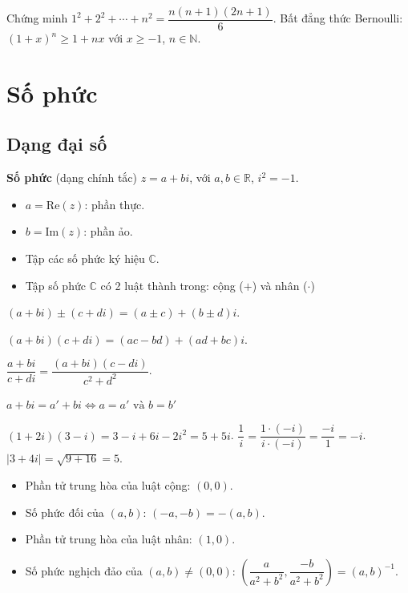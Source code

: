 \documentclass[12pt,a4paper]{article}
\begin{document}
\begin{vidu}
  Chứng minh $1^2 + 2^2 + \cdots + n^2 = \dfrac{n(n+1)(2n+1)}{6}$. Bất đẳng thức Bernoulli: $(1+x)^n \ge 1 + nx$ với $x \ge -1$, $n \in \mathbb{N}$.
\end{vidu}

\section{Số phức}

\subsection{Dạng đại số}

\begin{dinhnghia}
  \textbf{Số phức} (dạng chính tắc) $z = a + bi$, với $a, b \in \mathbb{R}$, $i^2 = -1$.
  \begin{itemize}
    \item $a = \mathrm{Re}(z)$: phần thực.
    \item $b = \mathrm{Im}(z)$: phần ảo.
    \item Tập các số phức ký hiệu $\mathbb{C}$.
    \item Tập số phức $\mathbb{C}$ có 2 luật thành trong: cộng ($+$) và nhân ($\cdot$)
  \end{itemize}
\end{dinhnghia}

\begin{congthuc}[title={Các phép toán}]
  $(a+bi) \pm (c+di) = (a \pm c) + (b \pm d)i$.
  
  $(a+bi)(c+di) = (ac-bd) + (ad+bc)i$.
  
  $\dfrac{a+bi}{c+di} = \dfrac{(a+bi)(c-di)}{c^2+d^2}$.

  $a + bi = a' + bi \Leftrightarrow a = a' \text{ và } b = b'$
\end{congthuc}

\begin{vidu}
  $(1+2i)(3-i) = 3 - i + 6i - 2i^2 = 5 + 5i$. $\dfrac{1}{i} = \dfrac{1 \cdot (-i)}{i \cdot (-i)} = \dfrac{-i}{1} = -i$. $|3+4i| = \sqrt{9+16} = 5$.
\end{vidu}

\begin{tinhchat}[title={$\mathbb{C}$ là trường}]
  \begin{itemize}
    \item Phần tử trung hòa của luật cộng: $(0, 0)$.
    \item Số phức đối của $(a, b)$: $(-a, -b) = -(a, b)$.
    \item Phần tử trung hòa của luật nhân: $(1, 0)$.
    \item Số phức nghịch đảo của $(a, b) \ne (0, 0)$: $\left(\dfrac{a}{a^2 + b^2}, \dfrac{-b}{a^2 + b^2}\right) = (a, b)^{-1}$.
  \end{itemize}
\end{tinhchat}
\end{document}
